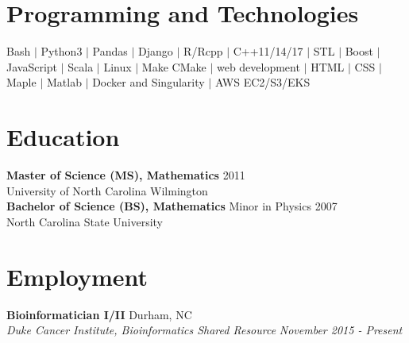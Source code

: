 \documentclass[10pt]{article}
\begin{document}

\section*{Programming and Technologies}

Bash $|$ Python3 $|$ Pandas $|$ Django $|$ R/Rcpp $|$ C++11/14/17 $|$ STL $|$ Boost $|$ JavaScript $|$ Scala $|$ Linux $|$ Make
CMake $|$ web development $|$ HTML $|$ CSS $|$ Maple $|$ Matlab $|$ Docker and Singularity $|$ AWS EC2/S3/EKS


\section*{Education}

{\bf Master of Science (MS), Mathematics} \hfill 2011\\
University of North Carolina Wilmington
\vspace{5pt}\\
\noindent
{\bf Bachelor of Science (BS), Mathematics} Minor in Physics \hfill 2007\\
North Carolina State University


\section*{Employment}

\noindent
{\bf Bioinformatician I/II} \hfill Durham, NC\\
{\it Duke Cancer Institute, Bioinformatics Shared Resource} \hfill {\it November 2015 - Present}
\end{document}
